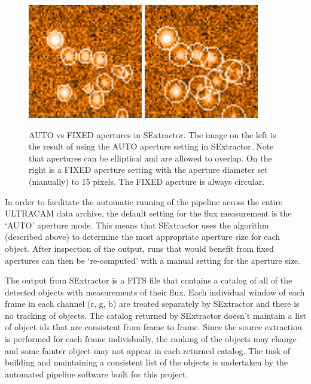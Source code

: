 \begin{enumerate}
\begin{figure}
  \centering
  \includegraphics[width=50mm]{images/sex_apertures_auto_cropped.png}
  \includegraphics[width=50mm]{images/sex_apertures_fixed_cropped.png}
  \caption{AUTO vs FIXED apertures in SExtractor. The image on the left is the result of using the AUTO aperture setting in SExtractor. Note that apertures can be elliptical and are allowed to overlap. On the right is a FIXED aperture setting with the aperture diameter set (manually) to 15 pixels. The FIXED aperture is always circular.}
\label{fig:fixedautoapertures}
\end{figure}
\end{enumerate}

In order to facilitate the automatic running of the pipeline across the entire ULTRACAM data archive, the default setting for the flux measurement is the `AUTO' aperture mode. This means that SExtractor uses the algorithm (described above) to determine the most appropriate aperture size for each object. After inspection of the output, runs that would benefit from fixed apertures can then be `re-computed' with a manual setting for the aperture size. 

The output from SExtractor is a FITS file that contains a catalog of all of the detected objects with measurements of their flux. Each individual window of each frame in each channel (r, g, b) are treated separately by SExtractor and there is no tracking of objects. The catalog returned by SExtractor doesn't maintain a list of object ids that are consistent from frame to frame. Since the source extraction is performed for each frame individually, the ranking of the objects may change and some fainter object may not appear in each returned catalog. The task of building and maintaining a consistent list of the objects is undertaken by the automated pipeline software built for this project. 

